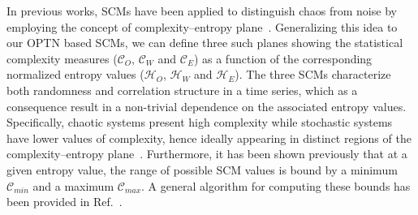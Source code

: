 \documentclass[aip,cha,reprint,nofootinbib]{revtex4-1}
\begin{document}
In previous works, SCMs have been applied to distinguish chaos from noise by employing the concept of complexity--entropy plane~\cite{rossoPRL2007}. Generalizing this idea to our OPTN based SCMs, we can define three such planes showing the statistical complexity measures ($\mathcal{C}_O$, $\mathcal{C}_W$ and $\mathcal{C}_E$) as a function of the corresponding normalized entropy values ($\mathcal{H}_O$, $\mathcal{H}_W$ and $\mathcal{H}_E$). The three SCMs characterize both randomness and correlation structure in a time series, which as a consequence result in a non-trivial dependence on the associated entropy values. Specifically, chaotic systems present high complexity while stochastic systems have lower values of complexity, hence ideally appearing in distinct regions of the complexity--entropy plane~\cite{rossoPRL2007}. Furthermore, {\color{red}it has been shown previously that at a given entropy value,} the range of possible SCM values is bound by a minimum $\mathcal{C}_{min}$ and a maximum $\mathcal{C}_{max}$. A general algorithm for computing these bounds has been provided in Ref.~\cite{martinPhyA2006}. 
\end{document}
